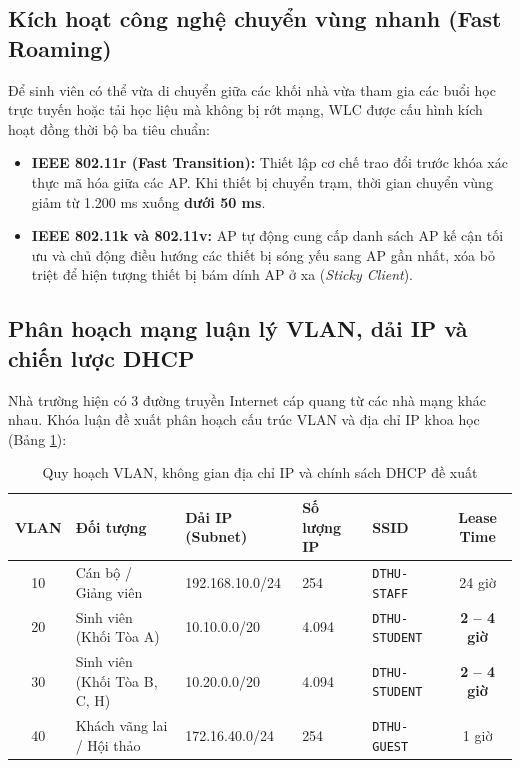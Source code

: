 \subsection{Kích hoạt công nghệ chuyển vùng nhanh (Fast Roaming)}

Để sinh viên có thể vừa di chuyển giữa các khối nhà vừa tham gia các buổi học trực tuyến hoặc tải học liệu mà không bị rớt mạng, WLC được cấu hình kích hoạt đồng thời bộ ba tiêu chuẩn:
\begin{itemize}
    \item \textbf{IEEE 802.11r (Fast Transition):} Thiết lập cơ chế trao đổi trước khóa xác thực mã hóa giữa các AP. Khi thiết bị chuyển trạm, thời gian chuyển vùng giảm từ 1.200 ms xuống \textbf{dưới 50 ms}.
    \item \textbf{IEEE 802.11k và 802.11v:} AP tự động cung cấp danh sách AP kế cận tối ưu và chủ động điều hướng các thiết bị sóng yếu sang AP gần nhất, xóa bỏ triệt để hiện tượng thiết bị bám dính AP ở xa (\textit{Sticky Client}).
\end{itemize}

\subsection{Phân hoạch mạng luận lý VLAN, dải IP và chiến lược DHCP}

Nhà trường hiện có 3 đường truyền Internet cáp quang từ các nhà mạng khác nhau. Khóa luận đề xuất phân hoạch cấu trúc VLAN và địa chỉ IP khoa học (Bảng \ref{tab:quy_hoach_vlan}):

\begin{table}[htbp]
\centering
\caption{Quy hoạch VLAN, không gian địa chỉ IP và chính sách DHCP đề xuất}
\label{tab:quy_hoach_vlan}
\small
\begin{tabular}{cllllc}
\toprule
\textbf{VLAN} & \textbf{Đối tượng} & \textbf{Dải IP (Subnet)} & \textbf{Số lượng IP} & \textbf{SSID} & \textbf{Lease Time} \\
\midrule
10 & Cán bộ / Giảng viên & 192.168.10.0/24 & 254 & \texttt{DTHU-STAFF} & 24 giờ \\
20 & Sinh viên (Khối Tòa A) & 10.10.0.0/20 & 4.094 & \texttt{DTHU-STUDENT} & \textbf{2 -- 4 giờ} \\
30 & Sinh viên (Khối Tòa B, C, H) & 10.20.0.0/20 & 4.094 & \texttt{DTHU-STUDENT} & \textbf{2 -- 4 giờ} \\
40 & Khách vãng lai / Hội thảo & 172.16.40.0/24 & 254 & \texttt{DTHU-GUEST} & 1 giờ \\
\bottomrule
\end{tabular}
\end{table}


